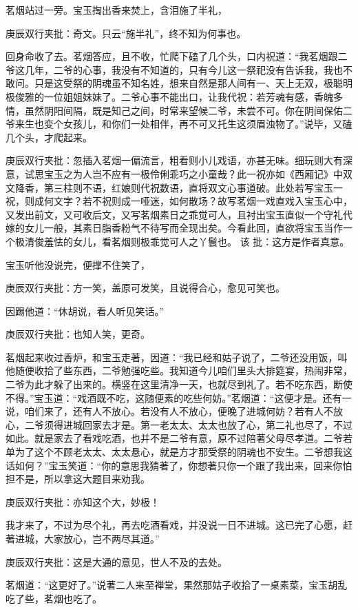 \begin{parag}


    茗烟站过一旁。宝玉掏出香来焚上，含泪施了半礼，\begin{note}庚辰双行夹批：奇文。只云“施半礼”，终不知为何事也。\end{note}回身命收了去。茗烟答应，且不收，忙爬下磕了几个头，口内祝道：“我茗烟跟二爷这几年，二爷的心事，我没有不知道的，只有今儿这一祭祀没有告诉我，我也不敢问。只是这受祭的阴魂虽不知名姓，想来自然是那人间有一、天上无双，极聪明极俊雅的一位姐姐妹妹了。二爷心事不能出口，让我代祝：若芳魂有感，香魄多情，虽然阴阳间隔，既是知己之间，时常来望候二爷，未尝不可。你在阴间保佑二爷来生也变个女孩儿，和你们一处相伴，再不可又托生这须眉浊物了。”说毕，又磕几个头，才爬起来。\begin{note}庚辰双行夹批：忽插入茗烟一偏流言，粗看则小儿戏语，亦甚无味。细玩则大有深意，试思宝玉之为人岂不应有一极伶俐乖巧之小童哉？此一祝亦如《西厢记》中双文降香，第三柱则不语，红娘则代祝数语，直将双文心事道破。此处若写宝玉一祝，则成何文字？若不祝则成一哑迷，如何散场？故写茗烟一戏直戏入宝玉心中，又发出前文，又可收后文，又写茗烟素日之乖觉可人，且衬出宝玉直似一个守礼代嫁的女儿一般，其素日脂香粉气不待写而全现出矣。今看此回，直欲将宝玉当作一个极清俊羞怯的女儿，看茗烟则极乖觉可人之丫鬟也。 该 批：这方是作者真意。\end{note}
\end{parag}


\begin{parag}


    宝玉听他没说完，便撑不住笑了，\begin{note}庚辰双行夹批：方一笑，盖原可发笑，且说得合心，愈见可笑也。\end{note}因踢他道：“休胡说，看人听见笑话。”\begin{note}庚辰双行夹批：也知人笑，更奇。\end{note}茗烟起来收过香炉，和宝玉走著，因道：“我已经和姑子说了，二爷还没用饭，叫他随便收拾了些东西，二爷勉强吃些。我知道今儿咱们里头大排筵宴，热闹非常，二爷为此才躲了出来的。横竖在这里清净一天，也就尽到礼了。若不吃东西，断使不得。”宝玉道：“戏酒既不吃，这随便素的吃些何妨。”茗烟道：“这便才是。还有一说，咱们来了，还有人不放心。若没有人不放心，便晚了进城何妨？若有人不放心，二爷须得进城回家去才是。第一老太太、太太也放了心，第二礼也尽了，不过如此。就是家去了看戏吃酒，也并不是二爷有意，原不过陪著父母尽孝道。二爷若单为了这个不顾老太太、太太悬心，就是方才那受祭的阴魂也不安生。二爷想我这话如何？”宝玉笑道：“你的意思我猜著了，你想著只你一个跟了我出来，回来你怕担不是，所以拿这大题目来劝我。\begin{note}庚辰双行夹批：亦知这个大，妙极！\end{note}我才来了，不过为尽个礼，再去吃酒看戏，并没说一日不进城。这已完了心愿，赶著进城，大家放心，岂不两尽其道。”\begin{note}庚辰双行夹批：这是大通的意见，世人不及的去处。\end{note}茗烟道：“这更好了。”说著二人来至禅堂，果然那姑子收拾了一桌素菜，宝玉胡乱吃了些，茗烟也吃了。
\end{parag}


